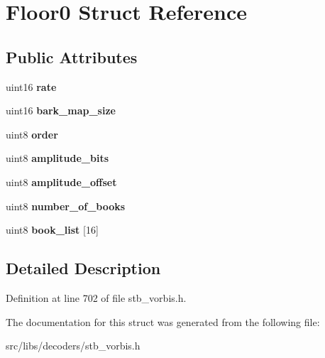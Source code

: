 \hypertarget{structFloor0}{\section{Floor0 Struct Reference}
\label{structFloor0}
}
\subsection*{Public Attributes}
\begin{DoxyCompactItemize}
\item 
\hypertarget{structFloor0_a922586e1bbbe9c1729764ce4e9c58081}{uint16 {\bfseries rate}}\label{structFloor0_a922586e1bbbe9c1729764ce4e9c58081}

\item 
\hypertarget{structFloor0_ad25748f935add45259c7739644c3dfde}{uint16 {\bfseries bark\-\_\-map\-\_\-size}}\label{structFloor0_ad25748f935add45259c7739644c3dfde}

\item 
\hypertarget{structFloor0_a4f6f2873ce6067d00a46711f1a77cc64}{uint8 {\bfseries order}}\label{structFloor0_a4f6f2873ce6067d00a46711f1a77cc64}

\item 
\hypertarget{structFloor0_a49a1999f7063382cf289e36f3f679281}{uint8 {\bfseries amplitude\-\_\-bits}}\label{structFloor0_a49a1999f7063382cf289e36f3f679281}

\item 
\hypertarget{structFloor0_a2c57037c224748b8bb5586f668a66903}{uint8 {\bfseries amplitude\-\_\-offset}}\label{structFloor0_a2c57037c224748b8bb5586f668a66903}

\item 
\hypertarget{structFloor0_ab72ef807e63af61f9e473752753b135a}{uint8 {\bfseries number\-\_\-of\-\_\-books}}\label{structFloor0_ab72ef807e63af61f9e473752753b135a}

\item 
\hypertarget{structFloor0_a9c9a2f623bc164826e892f7d75c484f2}{uint8 {\bfseries book\-\_\-list} \mbox{[}16\mbox{]}}\label{structFloor0_a9c9a2f623bc164826e892f7d75c484f2}

\end{DoxyCompactItemize}


\subsection{Detailed Description}


Definition at line 702 of file stb\-\_\-vorbis.\-h.



The documentation for this struct was generated from the following file\-:\begin{DoxyCompactItemize}
\item 
src/libs/decoders/stb\-\_\-vorbis.\-h\end{DoxyCompactItemize}
